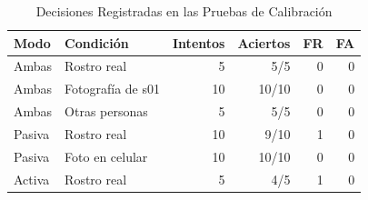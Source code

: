 \begin{table}[htbp]
\caption{Decisiones Registradas en las Pruebas de Calibración}
\label{tab:avances-resultados}
{\small\linespread{1}\selectfont
\begin{tabular}{@{}P{1.7cm}P{3.4cm}rrrr@{}}
\toprule
Modo & Condición & Intentos & Aciertos & FR & FA \\
\midrule
Ambas & Rostro real & 5 & 5/5 & 0 & 0 \\[0.5em]
Ambas & Fotografía de s01 & 10 & 10/10 & 0 & 0 \\[0.5em]
Ambas & Otras personas & 5 & 5/5 & 0 & 0 \\[0.5em]
Pasiva & Rostro real & 10 & 9/10 & 1 & 0 \\[0.5em]
Pasiva & Foto en celular & 10 & 10/10 & 0 & 0 \\[0.5em]
Activa & Rostro real & 5 & 4/5 & 1 & 0 \\[0.5em]
\bottomrule
\end{tabular}}
\end{table}
